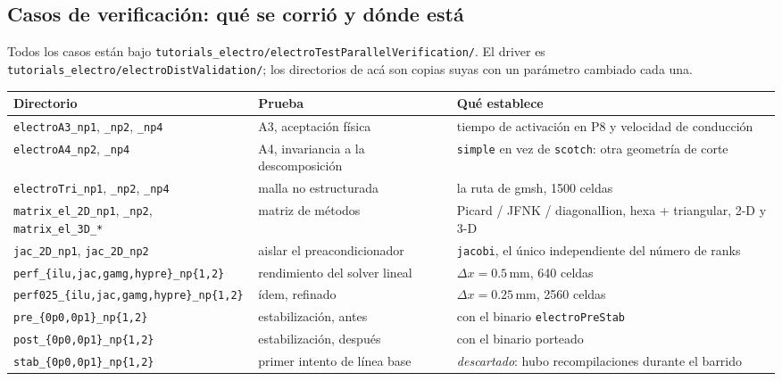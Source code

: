 \documentclass[11pt,a4paper]{article}
\newcommand{\code}[1]{\texttt{\small #1}}
\begin{document}
\subsection{Casos de verificación: qué se corrió y dónde está}
\label{sec:elec-parverif-casos}

Todos los casos están bajo
\code{tutorials\_electro/electroTestParallelVerification/}. El driver es
\code{tutorials\_electro/electroDistValidation/}; los directorios de acá son
copias suyas con un parámetro cambiado cada una.

\begin{center}
\begin{tabular}{@{}llp{6.2cm}@{}}
\toprule
Directorio & Prueba & Qué establece \\
\midrule
\code{electroA3\_np1}, \code{\_np2}, \code{\_np4}
  & A3, aceptación física
  & tiempo de activación en P8 y velocidad de conducción \\
\code{electroA4\_np2}, \code{\_np4}
  & A4, invariancia a la descomposición
  & \code{simple} en vez de \code{scotch}: otra geometría de corte \\
\code{electroTri\_np1}, \code{\_np2}, \code{\_np4}
  & malla no estructurada
  & la ruta de gmsh, 1500 celdas \\
\code{matrix\_el\_2D\_np1}, \code{\_np2}, \code{matrix\_el\_3D\_*}
  & matriz de métodos
  & Picard / JFNK / diagonalIion, hexa + triangular, 2-D y 3-D \\
\code{jac\_2D\_np1}, \code{jac\_2D\_np2}
  & aislar el preacondicionador
  & \code{jacobi}, el único independiente del número de ranks \\
\code{perf\_\{ilu,jac,gamg,hypre\}\_np\{1,2\}}
  & rendimiento del solver lineal
  & $\Delta x = 0.5$\,mm, 640 celdas \\
\code{perf025\_\{ilu,jac,gamg,hypre\}\_np\{1,2\}}
  & ídem, refinado
  & $\Delta x = 0.25$\,mm, 2560 celdas \\
\code{pre\_\{0p0,0p1\}\_np\{1,2\}}
  & estabilización, antes
  & con el binario \code{electroPreStab} \\
\code{post\_\{0p0,0p1\}\_np\{1,2\}}
  & estabilización, después
  & con el binario porteado \\
\code{stab\_\{0p0,0p1\}\_np\{1,2\}}
  & primer intento de línea base
  & \emph{descartado}: hubo recompilaciones durante el barrido \\
\bottomrule
\end{tabular}
\end{center}
\end{document}
